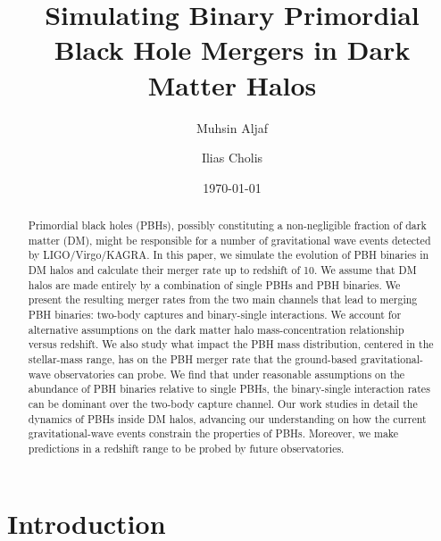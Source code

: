 \documentclass[aps, prd, reprint, nofootinbib]{revtex4-2}
\begin{document}
\title{Simulating Binary Primordial Black
Hole Mergers in Dark
Matter Halos}

\author{Muhsin Aljaf}
\author{Ilias Cholis}%

\date{\today}

\begin{abstract}
Primordial black holes (PBHs), possibly constituting a non-negligible fraction of dark matter (DM), might be responsible for a number of gravitational wave events detected by LIGO/Virgo/KAGRA. In this paper, we simulate the evolution of PBH binaries in DM halos and calculate their merger rate up to redshift of 10. We assume that DM halos are made entirely by a combination of single PBHs and PBH binaries. 
We present the resulting merger rates from  the two main channels that lead to merging PBH binaries: two-body captures and binary-single interactions. We account for alternative assumptions on the dark matter halo mass-concentration relationship versus redshift. We also study what impact the PBH mass distribution, centered in the stellar-mass range, has on the PBH merger rate that the ground-based gravitational-wave observatories can probe. 
We find that under reasonable assumptions on the abundance of PBH binaries relative to single PBHs, the binary-single interaction rates can be dominant over the two-body capture channel.  Our work studies in detail the dynamics of PBHs inside DM halos, advancing our understanding on how the current
gravitational-wave events constrain the properties of PBHs. Moreover, we make predictions in a redshift range to be probed by future observatories. 
\end{abstract}

\maketitle




\section{Introduction}\label{sec:intro}
\end{document}

